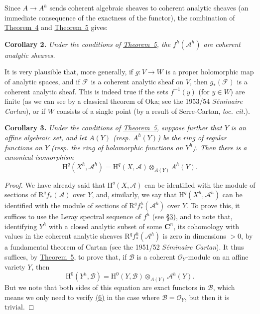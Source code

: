 \documentclass{article}
\newenvironment{itenv}[1]
  {\smallskip\noindent\textbf{#1.}\itshape}
  {\smallskip}
\newcommand{\scr}[1]{{\mathscr{#1}}}
\newcommand{\HH}{\mathrm{H}}
\newcommand{\RR}{\mathrm{R}}
\newcommand{\oldpage}[1]{\marginpar{\footnotesize$\Big\vert$ \textit{p.~#1}}}
\begin{document}
Since $A\to A^h$ sends coherent algebraic sheaves to coherent analytic sheaves (an immediate consequence of the exactness of the functor), the combination of \hyperref[theorem4]{Theorem~4} and \hyperref[theorem5]{Theorem~5} gives:

\begin{itenv}{Corollary 2}
\label{corollary2-5}
  Under the conditions of \hyperref[theorem5]{Theorem~5}, the $f^h(\scr{A}^h)$ are coherent analytic sheaves.
\end{itenv}

\oldpage{2-10}
It is very plausible that, more generally, if $g\colon V\to W$ is a proper holomorphic map of analytic spaces, and if $\scr{F}$ is a coherent analytic sheaf on $V$, then $g_*(\scr{F})$ is a coherent analytic sheaf.
This is indeed true if the sets $f^{-1}(y)$ (for $y\in W$) are finite (as we can see by a classical theorem of Oka; see the 1953/54 \emph{S\'{e}minaire Cartan}), or if $W$ consists of a single point (by a result of Serre-Cartan, \emph{loc. cit.}).

\begin{itenv}{Corollary 3}
\label{corollary3-5}
  Under the conditions of \hyperref[theorem5]{Theorem~5}, suppose further that $Y$ is an \emph{affine} algebraic set, and let $A(Y)$ (resp. $A^h(Y)$) be the ring of regular functions on $Y$ (resp. the ring of holomorphic functions on $Y^h$).
  Then there is a canonical isomorphism
  \[
  \label{equation5}
    \HH^q(X^h,\scr{A}^h) = \HH^q(X,\scr{A})\otimes_{A(Y)}A^h(Y).
    \tag{5}
  \]
\end{itenv}

\begin{proof}
  We have already said that $\HH^q(X,\scr{A})$ can be identified with the module of sections of $\RR^qf_*(\scr{A})$ over $Y$, and, similarly, we say that $\HH^q(X^h,\scr{A}^h)$ can be identified with the module of sections of $\RR^qf_*^h(\scr{A}^h)$ over $Y$.
  To prove this, it suffices to use the Leray spectral sequence of $f^h$ (see \hyperref[section3]{\S3}), and to note that, identifying $Y^h$ with a closed analytic subset of some $\mathbf{C}^n$, its cohomology with values in the coherent analytic sheaves $\RR^qf_*^h(\scr{A}^h)$ is zero in dimensions $>0$, by a fundamental theorem of Cartan (see the 1951/52 \emph{S\'{e}minaire Cartan}).
  It thus suffices, by \hyperref[theorem5]{Theorem~5}, to prove that, if $\scr{B}$ is a coherent $\scr{O}_Y$-module on an affine variety $Y$, then
  \[
  \label{equation6}
    \HH^0(Y^h,\scr{B}) = \HH^0(Y,\scr{B})\otimes_{A(Y)}\scr{A}^h(Y).
    \tag{6}
  \]
  But we note that both sides of this equation are exact functors in $\scr{B}$, which means we only need to verify \hyperref[equation6]{(6)} in the case where $\scr{B}=\scr{O}_Y$, but then it is trivial.
\end{proof}
\end{document}
